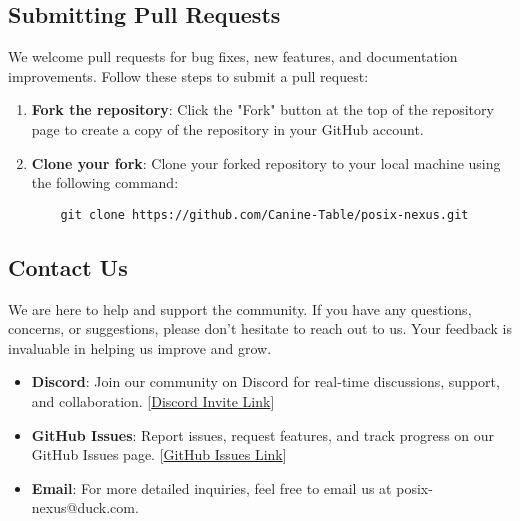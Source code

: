 \subsection{Submitting Pull Requests}
We welcome pull requests for bug fixes, new features, and documentation improvements. Follow these steps to submit a pull request:
\begin{enumerate}
    \item \textbf{Fork the repository}: Click the "Fork" button at the top of the repository page to create a copy of the repository in your GitHub account.
    \item \textbf{Clone your fork}: Clone your forked repository to your local machine using the following command:
    \begin{lstlisting}
    git clone https://github.com/Canine-Table/posix-nexus.git
    \end{lstlisting}
\end{enumerate}

\subsection{Contact Us}
We are here to help and support the community. If you have any questions, concerns, or suggestions, please don't hesitate to reach out to us. Your feedback is invaluable in helping us improve and grow.

\begin{itemize}
    \item \textbf{Discord}: Join our  community on Discord for real-time discussions, support, and collaboration. [\href{https://discord.gg/GB9twwpCNM}{Discord Invite Link}]
    \item \textbf{GitHub Issues}: Report issues, request features, and track progress on our GitHub Issues page. [\href{https://github.com/Canine-Table/posix-nexus/issues}{GitHub Issues Link}]
    \item \textbf{Email}: For more detailed inquiries, feel free to email us at posix-nexus@duck.com.
\end{itemize}
